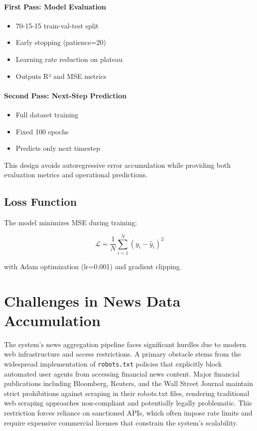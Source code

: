 \documentclass{article}
\begin{document}
	\paragraph{First Pass: Model Evaluation}
	\begin{itemize}
		\item 70-15-15 train-val-test split
		\item Early stopping (patience=20)
		\item Learning rate reduction on plateau
		\item Outputs R² and MSE metrics
	\end{itemize}
	
	\paragraph{Second Pass: Next-Step Prediction}
	\begin{itemize}
		\item Full dataset training
		\item Fixed 100 epochs
		\item Predicts only next timestep
	\end{itemize}
	
	This design avoids autoregressive error accumulation while providing both evaluation metrics and operational predictions.
	
	\subsection{Loss Function}
	The model minimizes MSE during training:
	
	\begin{equation}
		\mathcal{L} = \frac{1}{N}\sum_{i=1}^N (y_i - \hat{y}_i)^2
	\end{equation}
	
	with Adam optimization (lr=0.001) and gradient clipping.
	
	\section{Challenges in News Data Accumulation}
	
	The system's news aggregation pipeline faces significant hurdles due to modern web infrastructure and access restrictions. A primary obstacle stems from the widespread implementation of \texttt{robots.txt} policies that explicitly block automated user agents from accessing financial news content. Major financial publications including Bloomberg, Reuters, and the Wall Street Journal maintain strict prohibitions against scraping in their robots.txt files, rendering traditional web scraping approaches non-compliant and potentially legally problematic. This restriction forces reliance on sanctioned APIs, which often impose rate limits and require expensive commercial licenses that constrain the system's scalability.
	
\end{document}
